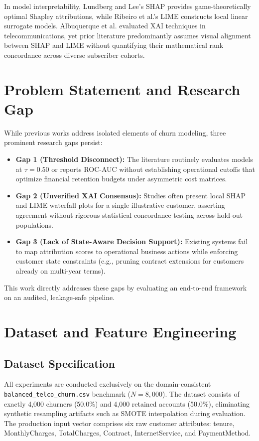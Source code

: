 \documentclass[conference]{IEEEtran}
\begin{document}
In model interpretability, Lundberg and Lee's SHAP \cite{lundberg2017unified} provides game-theoretically optimal Shapley attributions, while Ribeiro et al.'s LIME \cite{ribeiro2016why} constructs local linear surrogate models. Albuquerque et al. \cite{albuquerque2022machine} evaluated XAI techniques in telecommunications, yet prior literature predominantly assumes visual alignment between SHAP and LIME without quantifying their mathematical rank concordance across diverse subscriber cohorts.

\section{Problem Statement and Research Gap}
While previous works address isolated elements of churn modeling, three prominent research gaps persist:
\begin{itemize}
    \item \textbf{Gap 1 (Threshold Disconnect):} The literature routinely evaluates models at $\tau = 0.50$ or reports ROC-AUC without establishing operational cutoffs that optimize financial retention budgets under asymmetric cost matrices.
    \item \textbf{Gap 2 (Unverified XAI Consensus):} Studies often present local SHAP and LIME waterfall plots for a single illustrative customer, asserting agreement without rigorous statistical concordance testing across hold-out populations.
    \item \textbf{Gap 3 (Lack of State-Aware Decision Support):} Existing systems fail to map attribution scores to operational business actions while enforcing customer state constraints (e.g., pruning contract extensions for customers already on multi-year terms).
\end{itemize}

This work directly addresses these gaps by evaluating an end-to-end framework on an audited, leakage-safe pipeline.

\section{Dataset and Feature Engineering}

\subsection{Dataset Specification}
All experiments are conducted exclusively on the domain-consistent \texttt{balanced\_telco\_churn.csv} benchmark ($N = 8,000$). The dataset consists of exactly 4,000 churners (50.0\%) and 4,000 retained accounts (50.0\%), eliminating synthetic resampling artifacts such as SMOTE interpolation \cite{chawla2002smote} during evaluation. The production input vector comprises six raw customer attributes: tenure, MonthlyCharges, TotalCharges, Contract, InternetService, and PaymentMethod.
\end{document}
